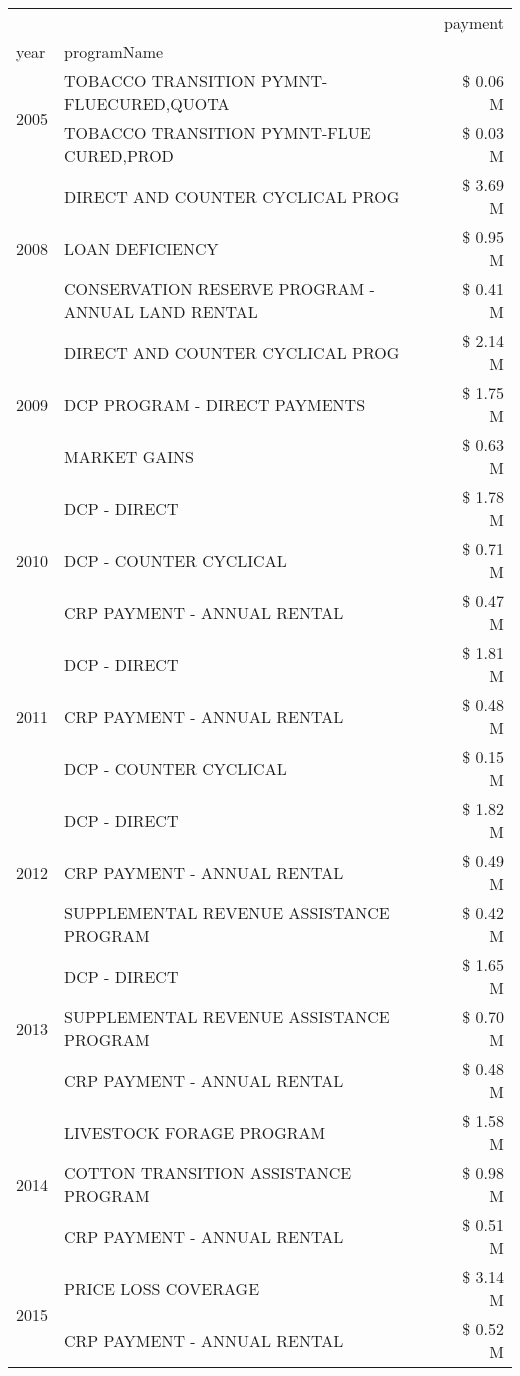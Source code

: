\begin{tabular}{llr}
\toprule
 &  & payment \\
year & programName &  \\
\midrule
\multirow[t]{2}{*}{2005} & TOBACCO TRANSITION PYMNT-FLUECURED,QUOTA & \$ 0.06 M \\
 & TOBACCO TRANSITION PYMNT-FLUE CURED,PROD & \$ 0.03 M \\
\cline{1-3}
\multirow[t]{3}{*}{2008} & DIRECT AND COUNTER CYCLICAL PROG & \$ 3.69 M \\
 & LOAN DEFICIENCY & \$ 0.95 M \\
 & CONSERVATION RESERVE PROGRAM - ANNUAL LAND RENTAL & \$ 0.41 M \\
\cline{1-3}
\multirow[t]{3}{*}{2009} & DIRECT AND COUNTER CYCLICAL PROG & \$ 2.14 M \\
 & DCP PROGRAM - DIRECT PAYMENTS & \$ 1.75 M \\
 & MARKET GAINS & \$ 0.63 M \\
\cline{1-3}
\multirow[t]{3}{*}{2010} & DCP - DIRECT & \$ 1.78 M \\
 & DCP - COUNTER CYCLICAL & \$ 0.71 M \\
 & CRP PAYMENT - ANNUAL RENTAL & \$ 0.47 M \\
\cline{1-3}
\multirow[t]{3}{*}{2011} & DCP - DIRECT & \$ 1.81 M \\
 & CRP PAYMENT - ANNUAL RENTAL & \$ 0.48 M \\
 & DCP - COUNTER CYCLICAL & \$ 0.15 M \\
\cline{1-3}
\multirow[t]{3}{*}{2012} & DCP - DIRECT & \$ 1.82 M \\
 & CRP PAYMENT - ANNUAL RENTAL & \$ 0.49 M \\
 & SUPPLEMENTAL REVENUE ASSISTANCE PROGRAM & \$ 0.42 M \\
\cline{1-3}
\multirow[t]{3}{*}{2013} & DCP - DIRECT & \$ 1.65 M \\
 & SUPPLEMENTAL REVENUE ASSISTANCE PROGRAM & \$ 0.70 M \\
 & CRP PAYMENT - ANNUAL RENTAL & \$ 0.48 M \\
\cline{1-3}
\multirow[t]{3}{*}{2014} & LIVESTOCK FORAGE PROGRAM & \$ 1.58 M \\
 & COTTON TRANSITION ASSISTANCE PROGRAM & \$ 0.98 M \\
 & CRP PAYMENT - ANNUAL RENTAL & \$ 0.51 M \\
\cline{1-3}
\multirow[t]{3}{*}{2015} & PRICE LOSS COVERAGE & \$ 3.14 M \\
 & CRP PAYMENT - ANNUAL RENTAL & \$ 0.52 M \\

\end{tabular}

